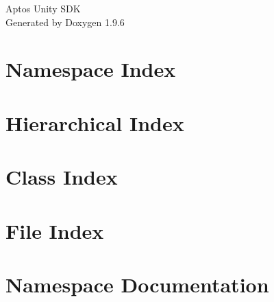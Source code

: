 \documentclass[twoside]{book}
\newcommand{\+}{\discretionary{\mbox{\scriptsize$\hookleftarrow$}}{}{}}
\newcommand{\clearemptydoublepage}{%
    \newpage{\pagestyle{empty}\cleardoublepage}%
  }
\begin{document}
  \raggedbottom
    \hypersetup{pageanchor=false,
                bookmarksnumbered=true,
                pdfencoding=unicode
               }
  \begin{titlepage}
  \vspace*{7cm}
  \begin{center}%
  {\Large Aptos Unity SDK}\\
  \vspace*{1cm}
  {\large Generated by Doxygen 1.9.6}\\
  \end{center}
  \end{titlepage}
  \clearemptydoublepage
  \tableofcontents
  \clearemptydoublepage
  \hypersetup{pageanchor=true}
\chapter{Namespace Index}

\chapter{Hierarchical Index}

\chapter{Class Index}

\chapter{File Index}

\chapter{Namespace Documentation}













\end{document}
